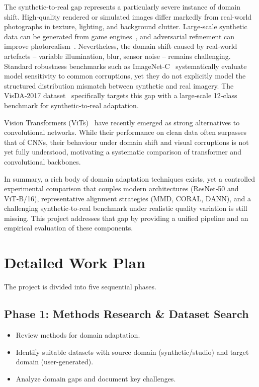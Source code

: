 \documentclass[a4paper,12pt]{extarticle}
\begin{document}
The synthetic‑to‑real gap represents a particularly severe instance of domain shift. High‑quality rendered or simulated
images differ markedly from real‑world photographs in texture, lighting, and background clutter. Large‑scale synthetic
data can be generated from game engines~\cite{richter2016playing}, and adversarial refinement can improve
photorealism~\cite{shrivastava2017learning}. Nevertheless, the domain shift caused by real‑world artefacts -- variable
illumination, blur, sensor noise -- remains challenging. Standard robustness benchmarks such as
ImageNet‑C~\cite{hendrycks2019benchmarking} systematically evaluate model sensitivity to common corruptions, yet they
do not explicitly model the structured distribution mismatch between synthetic and real imagery. The VisDA‑2017
dataset~\cite{visda2017} specifically targets this gap with a large‑scale 12‑class benchmark for synthetic‑to‑real
adaptation.

Vision Transformers (ViTs)~\cite{dosovitskiy2020image} have recently emerged as strong alternatives to convolutional
networks. While their performance on clean data often surpasses that of CNNs, their behaviour under domain shift and
visual corruptions is not yet fully understood, motivating a systematic comparison of transformer and convolutional
backbones.

In summary, a rich body of domain adaptation techniques exists, yet a controlled experimental comparison that couples
modern architectures (ResNet‑50 and ViT‑B/16), representative alignment strategies (MMD, CORAL, DANN), and a
challenging synthetic‑to‑real benchmark under realistic quality variation is still missing. This project addresses that
gap by providing a unified pipeline and an empirical evaluation of these components.

\section{Detailed Work Plan}
\label{sec:workplan}
The project is divided into five sequential phases.

\subsection{Phase 1: Methods Research \& Dataset Search}
\begin{itemize}
	\item Review methods for domain adaptation.
	\item Identify suitable datasets with source domain (synthetic/studio) and target domain (user-generated).
	\item Analyze domain gaps and document key challenges.
\end{itemize}
\end{document}
